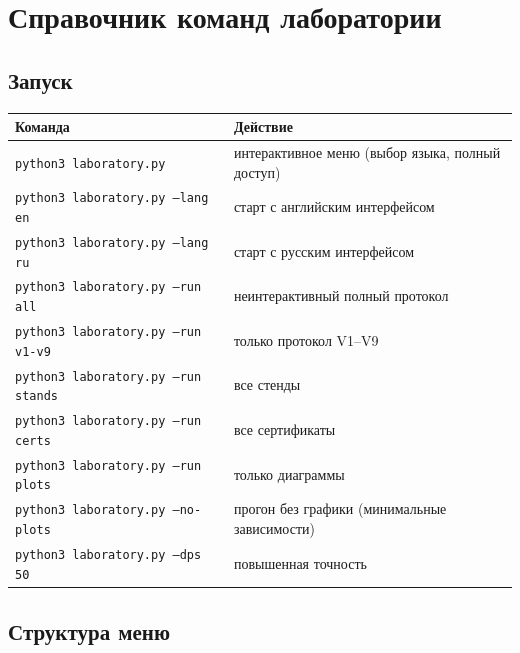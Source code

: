 \section{Справочник команд лаборатории}\label{app:cli}

\subsection{Запуск}

\begin{center}
\small
\begin{tabularx}{\textwidth}{@{}l >{\raggedright\arraybackslash}X@{}}
\toprule
Команда & Действие \\
\midrule
\texttt{python3 laboratory.py} & интерактивное меню (выбор языка,
полный доступ) \\
\texttt{python3 laboratory.py --lang en} & старт с английским
интерфейсом \\
\texttt{python3 laboratory.py --lang ru} & старт с русским
интерфейсом \\
\texttt{python3 laboratory.py --run all} & неинтерактивный полный
протокол \\
\texttt{python3 laboratory.py --run v1-v9} & только протокол
V1--V9 \\
\texttt{python3 laboratory.py --run stands} & все стенды \\
\texttt{python3 laboratory.py --run certs} & все сертификаты \\
\texttt{python3 laboratory.py --run plots} & только диаграммы \\
\texttt{python3 laboratory.py --no-plots} & прогон без графики
(минимальные зависимости) \\
\texttt{python3 laboratory.py --dps 50} & повышенная точность \\
\bottomrule
\end{tabularx}
\end{center}

\subsection{Структура меню}

